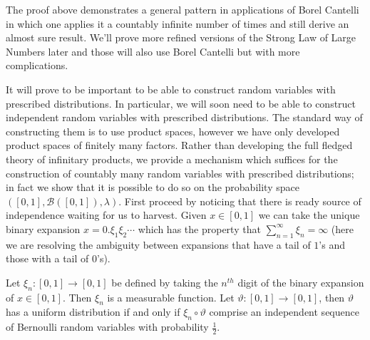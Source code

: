 The proof above demonstrates a general pattern in applications of
Borel Cantelli in which one applies it a countably infinite number of
times and still derive an almost sure result.  We'll prove more
refined versions of the Strong Law of Large Numbers later and those
will also use Borel Cantelli but with more complications.


It will prove to be important to be able to construct random variables
with prescribed distributions.  In particular, we will soon need to be
able to construct independent random variables with prescribed
distributions.  The standard way of constructing them is to use
product spaces, however we have only developed product spaces of
finitely many factors.  Rather than developing the full fledged theory
of infinitary products, we provide a mechanism which suffices for the
construction of countably many random variables with prescribed
distributions; in fact we show that it is possible to do so on the
probability space $([0,1], \mathcal{B}([0,1]), \lambda)$.  First
proceed by noticing that there is ready source of independence waiting
for us to harvest.  Given $x \in [0,1]$ we can take the unique binary
expansion $x = 0.\xi_1\xi_2 \cdots$ which has the property that
$\sum_{n=1}^\infty \xi_n = \infty$ (here we are resolving the ambiguity
between expansions that have a tail of $1$'s and those with a tail of
$0$'s).
\begin{lem}\label{BernoulliSequence}Let $\xi_n : [0,1] \to [0,1]$ be defined by taking the
  $n^{th}$ digit of the binary expansion of $x \in [0,1]$.  Then
  $\xi_n$ is a measurable function.  Let $\vartheta :  [0,1] \to
  [0,1]$, then $\vartheta$ has a uniform distribution if and only if
  $\xi_n \circ \vartheta$ comprise an independent sequence of
  Bernoulli random variables with probability $\frac{1}{2}$.
\end{lem}
